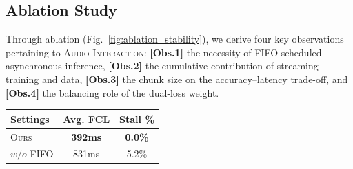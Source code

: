 \documentclass{article}
\begin{document}
\subsection{Ablation Study}
\vspace{-4mm}
\begin{minipage}[t]{0.60\textwidth}
\vspace{0mm}
Through ablation (Fig.~\ref{fig:ablation_stability}), we derive four key observations pertaining to \textsc{Audio-Interaction}:
\textbf{[Obs.1]} the necessity of FIFO-scheduled asynchronous inference,
\textbf{[Obs.2]} the cumulative contribution of streaming training and data, \textbf{[Obs.3]} the chunk size on the accuracy--latency trade-off, and
\textbf{[Obs.4]} the balancing role of the dual-loss weight.
\end{minipage}
\hfill
\begin{minipage}[t]{0.38\textwidth}
\small
\centering
\vspace{2mm}
\vspace{-2mm}
\label{tab:fifo_inference}
\begin{tabular}{lcc}
\toprule
\textbf{Settings} & \textbf{Avg. FCL} & \textbf{Stall \%} \\
\midrule
\textsc{Ours} & \textbf{392ms} & \textbf{0.0\%} \\
\quad $w/o$ FIFO & 831ms & 5.2\% \\
\bottomrule
\end{tabular}
\end{minipage}
\end{document}
